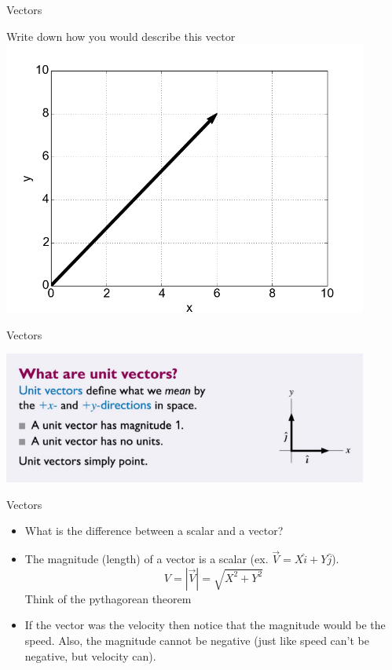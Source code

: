 \documentclass{beamer}
\begin{document}
\begin{frame}{Vectors}
\begin{center}
   Write down how you would describe this vector
   \includegraphics[width=0.9\textwidth]{../figures/vec_chap3.png}
\end{center}
\end{frame}

\begin{frame}{Vectors}
\begin{center}
   \includegraphics[width=0.9\textwidth]{../figures/3_unitvector.png}
\end{center}
\end{frame}

\begin{frame}{Vectors}
\begin{itemize}
   \item<1-> What is the difference between a scalar and a vector?
   \item<2-> The magnitude (length) of a vector is a scalar (ex. $\vec{V}=X\hat{i}+Y\hat{j}$).
   \begin{equation*}
      V=\left|\vec{V}\right| = \sqrt{X^2+Y^2}
   \end{equation*}
   Think of the pythagorean theorem
   \item<3-> If the vector was the velocity then notice that the magnitude would be the speed. Also, the magnitude cannot be negative (just like speed can't be negative, but velocity can).
\end{itemize}
\end{frame}
\end{document}
